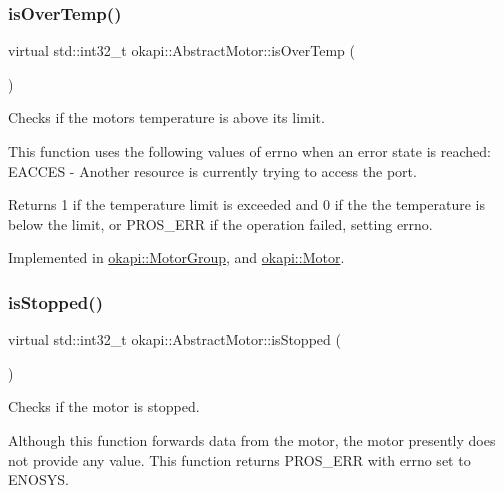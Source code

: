 \subsubsection{\texorpdfstring{isOverTemp()}{isOverTemp()}}
{\footnotesize\ttfamily virtual std\+::int32\+\_\+t okapi\+::\+Abstract\+Motor\+::is\+Over\+Temp (\begin{DoxyParamCaption}{ }\end{DoxyParamCaption})\hspace{0.3cm}{\ttfamily [pure virtual]}}

Checks if the motor\textquotesingle{}s temperature is above its limit.

This function uses the following values of errno when an error state is reached\+: E\+A\+C\+C\+ES -\/ Another resource is currently trying to access the port.

\begin{DoxyReturn}{Returns}
1 if the temperature limit is exceeded and 0 if the the temperature is below the limit, or P\+R\+O\+S\+\_\+\+E\+RR if the operation failed, setting errno. 
\end{DoxyReturn}


Implemented in \mbox{\hyperlink{classokapi_1_1MotorGroup_a60eaf29b00c8c0f26b9e70f3f28f74be}{okapi\+::\+Motor\+Group}}, and \mbox{\hyperlink{classokapi_1_1Motor_a8a51f7dede42f768280b73d85a528d91}{okapi\+::\+Motor}}.

\mbox{\label{classokapi_1_1AbstractMotor_aa46c96a6eec7921ad5b12fcd4119358e}} 
\subsubsection{\texorpdfstring{isStopped()}{isStopped()}}
{\footnotesize\ttfamily virtual std\+::int32\+\_\+t okapi\+::\+Abstract\+Motor\+::is\+Stopped (\begin{DoxyParamCaption}{ }\end{DoxyParamCaption})\hspace{0.3cm}{\ttfamily [pure virtual]}}

Checks if the motor is stopped.

Although this function forwards data from the motor, the motor presently does not provide any value. This function returns P\+R\+O\+S\+\_\+\+E\+RR with errno set to E\+N\+O\+S\+YS.

